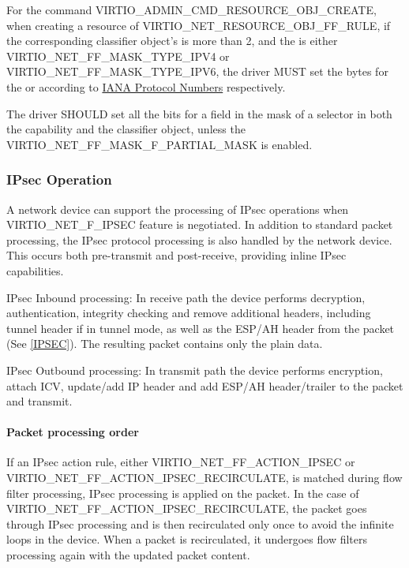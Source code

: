 For the command VIRTIO_ADMIN_CMD_RESOURCE_OBJ_CREATE, when creating a resource of
 VIRTIO_NET_RESOURCE_OBJ_FF_RULE, if the corresponding classifier
object's  is more than 2, and the  is either
VIRTIO_NET_FF_MASK_TYPE_IPV4 or VIRTIO_NET_FF_MASK_TYPE_IPV6, the driver MUST
set the  bytes for the  or 
according to \hyperref[intro:IANA Protocol Numbers]{IANA Protocol Numbers} respectively.

The driver SHOULD set all the bits for a field in the mask of a selector in both the
capability and the classifier object, unless the VIRTIO_NET_FF_MASK_F_PARTIAL_MASK
is enabled.

\subsubsection{IPsec Operation}\label{sec:Device Types / Network Device / Device Operation / IPsec Operation}

A network device can support the processing of IPsec operations when
VIRTIO_NET_F_IPSEC feature is negotiated. In addition to standard packet
processing, the IPsec protocol processing is also handled by the network device.
This occurs both pre-transmit and post-receive, providing inline IPsec capabilities.

IPsec Inbound processing: In receive path the device performs decryption,
authentication, integrity checking and remove additional headers, including
tunnel header if in tunnel mode, as well as the ESP/AH header from the packet
(See \hyperref[intro:IPSEC]{[IPSEC]}). The resulting packet contains only the plain data.

IPsec Outbound processing: In transmit path the device performs encryption,
attach ICV, update/add IP header and add ESP/AH header/trailer to the packet
and transmit.

\paragraph{Packet processing order}
\label{par:Device Types / Network Device / Device Operation / IPsec Operation / Packet processing order}

If an IPsec action rule, either VIRTIO_NET_FF_ACTION_IPSEC or VIRTIO_NET_FF_ACTION_IPSEC_RECIRCULATE,
is matched during flow filter processing, IPsec processing is applied on the packet.
In the case of VIRTIO_NET_FF_ACTION_IPSEC_RECIRCULATE, the packet goes through IPsec processing and
is then recirculated only once to avoid the infinite loops in the device. When a packet is
recirculated, it undergoes flow filters processing again with the updated packet content.

